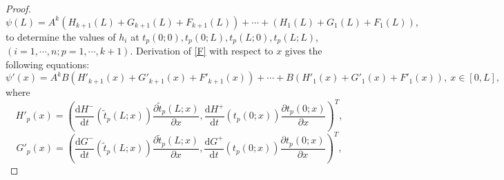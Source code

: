 \documentclass[a4paper,reqno,11pt]{amsart}
\numberwithin{equation}{section} %
\begin{document}
\begin{proof}
\begin{equation}
\psi\left(L \right) =A^k\left( H_{k+1}\left( L \right) +G_{k+1}\left( L \right)+F_{k+1}\left( L \right) \right)+\cdots +\left( H_1\left( L \right) +G_1\left( L \right)+F_1\left( L \right) \right) ,
\end{equation}
to determine the values of $h_i$ at $t_p(0;0),t_p(0;L),t_p(L;0),t_p(L;L)$,$(i=1,\cdots,n; p=1,\cdots,k+1)$.
Derivation of  \eqref{F} with respect to $x$ gives the following equations:
\begin{equation}\label{derivative of psi}
	\psi  '\left( x \right)=A^kB(H'_{k+1}\left( x \right)+G'_{k+1}\left( x \right)+F'_{k+1}\left( x \right)) +\cdots + B(H'_1\left( x \right)+G'_1\left( x \right)+F'_1\left( x \right)) ,\ x\in \left[ 0,L \right],
\end{equation}
where 
$$
H'_{p}\left( x \right) =\left( \frac{\text{d} H^{-}}{ \text{d}t} \left( \tilde{t}_{p}(L;x) \right) \frac{\partial \tilde{t} _{p}(L;x)}{\partial x} ,\frac{\text{d} H^{+}}{\text{d} t}\left( t_{p}(0;x)\right) \frac{\partial t_{p}(0;x)}{\partial x} \right) ^T,
$$
$$
G'_{p}\left( x \right) =\left( \frac{\text{d} G^{-}}{\text{d} t}\left( \tilde{t}_{p}(L;x) \right) \frac{\partial \tilde{t}  _{p}(L;x)}{\partial x} ,\frac{\text{d} G^{+}}{\text{d} t}\left( t_{p}(0;x)\right) \frac{\partial t_{p}(0;x)}{\partial x} \right) ^T,
$$

\end{proof}
\end{document}
